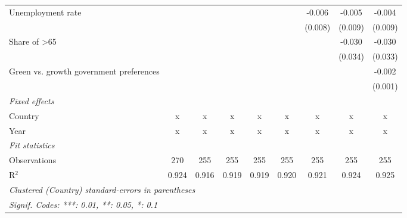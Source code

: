 \begin{table}[htbp]
\begin{tabular}{lcccccccc}
      Unemployment rate                       &         &         &              &             &              & -0.006       & -0.005  & -0.004\\   
                                              &         &         &              &             &              & (0.008)      & (0.009) & (0.009)\\   
      Share of >65                            &         &         &              &             &              &              & -0.030  & -0.030\\   
                                              &         &         &              &             &              &              & (0.034) & (0.033)\\   
      Green vs. growth government preferences &         &         &              &             &              &              &         & -0.002\\   
                                              &         &         &              &             &              &              &         & (0.001)\\   
      \emph{Fixed effects}\\
      Country                                 & x       & x       & x            & x           & x            & x            & x       & x\\  
      Year                                    & x       & x       & x            & x           & x            & x            & x       & x\\  
      \midrule \emph{Fit statistics}\\
      Observations                            & 270     & 255     & 255          & 255         & 255          & 255          & 255     & 255\\  
      R$^2$                                   & 0.924   & 0.916   & 0.919        & 0.919       & 0.920        & 0.921        & 0.924   & 0.925\\  
      \midrule
      \multicolumn{9}{l}{\emph{Clustered (Country) standard-errors in parentheses}}\\
      \multicolumn{9}{l}{\emph{Signif. Codes: ***: 0.01, **: 0.05, *: 0.1}}\\
   \end{tabular}
\end{table}


